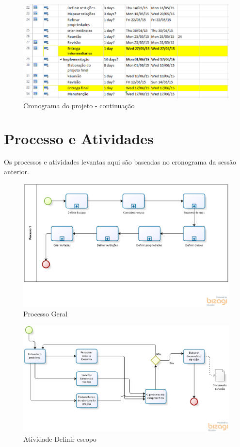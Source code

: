  \begin{figure}[ht]
  \centering
    \includegraphics[keepaspectratio=true,scale=0.5]{figuras/cronograma.eps}
  \caption{Cronograma do projeto - continuação}
\end{figure}

\section{Processo e Atividades}

Os processos e atividades levantas aqui são baseadas no cronograma da sessão anterior.

 \begin{figure}[H]
  \centering
    \includegraphics[keepaspectratio=true,scale=0.5]{figuras/Geral.eps}
  \caption{Processo Geral}
\end{figure}

 \begin{figure}[H]
  \centering
    \includegraphics[keepaspectratio=true,scale=0.5]{figuras/Definir_escopo.eps}
  \caption{Atividade Definir escopo}
\end{figure}

